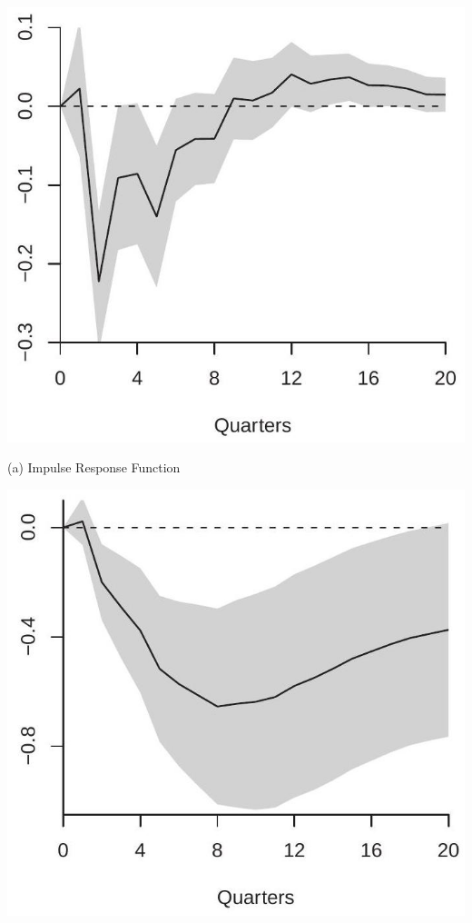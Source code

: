 \documentclass[10pt]{article}
\begin{document}
\includegraphics[max width=\textwidth]{2022_10_23_7c0e31a459390f548ae3g-19}

(a) Impulse Response Function

\includegraphics[max width=\textwidth]{2022_10_23_7c0e31a459390f548ae3g-19(1)}
\end{document}
